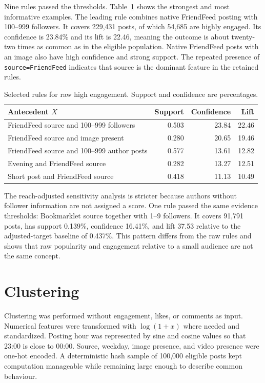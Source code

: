 \documentclass[10pt,a4paper]{article}
\begin{document}
Nine rules passed the thresholds. Table~\ref{tab:rules} shows the strongest and most informative examples. The leading rule combines native FriendFeed posting with 100--999 followers. It covers 229,431 posts, of which 54,685 are highly engaged. Its confidence is 23.84\% and its lift is 22.46, meaning the outcome is about twenty-two times as common as in the eligible population. Native FriendFeed posts with an image also have high confidence and strong support. The repeated presence of \texttt{source=FriendFeed} indicates that source is the dominant feature in the retained rules.

\begin{table}[ht]
\centering
\caption{Selected rules for raw high engagement. Support and confidence are percentages.}
\label{tab:rules}
\small
\begin{tabularx}{\linewidth}{>{\raggedright\arraybackslash}X r r r}
\toprule
Antecedent $X$ & Support & Confidence & Lift \\
\midrule
FriendFeed source and 100--999 followers & 0.503 & 23.84 & 22.46 \\
FriendFeed source and image present & 0.280 & 20.65 & 19.46 \\
FriendFeed source and 100--999 author posts & 0.577 & 13.61 & 12.82 \\
Evening and FriendFeed source & 0.282 & 13.27 & 12.51 \\
Short post and FriendFeed source & 0.418 & 11.13 & 10.49 \\
\bottomrule
\end{tabularx}
\end{table}

The reach-adjusted sensitivity analysis is stricter because authors without follower information are not assigned a score. One rule passed the same evidence thresholds: Bookmarklet source together with 1--9 followers. It covers 91,791 posts, has support 0.139\%, confidence 16.41\%, and lift 37.53 relative to the adjusted-target baseline of 0.437\%. This pattern differs from the raw rules and shows that raw popularity and engagement relative to a small audience are not the same concept.

\section{Clustering}

Clustering was performed without engagement, likes, or comments as input. Numerical features were transformed with $\log(1+x)$ where needed and standardized. Posting hour was represented by sine and cosine values so that 23:00 is close to 00:00. Source, weekday, image presence, and video presence were one-hot encoded. A deterministic hash sample of 100,000 eligible posts kept computation manageable while remaining large enough to describe common behaviour.
\end{document}
